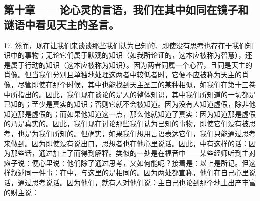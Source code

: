 
\subsection{第十章——论心灵的言语，我们在其中如同在镜子和谜语中看见天主的圣言。}

17. 然而，现在让我们来谈谈那些我们认为已知的、即使没有思考也存在于我们知识中的事物；无论它们属于默观的知识（如我所论证的，这本应被称为智慧），还是属于行动的知识（这本应被称为知识）。因为两者同属一个心智，且同是天主的肖像。但当我们分别且单独地处理这两者中较低者时，它便不应被称为天主的肖像，尽管即使在那个时候，其中也能找到天主圣三的某种相似，如我们在第十三卷中所指出的。因此，我们现在谈论的是人的整体知识，其中我们所知道的一切都是已知的；至少是真实的知识；否则它就不会被知道。因为没有人知道虚假，除非他知道那是虚假的；而如果他知道这一点，那么他就知道了真实：因为知道那是虚假的乃是真实的。因此，我们现在讨论那些我们认为已知的事物，即使它们没有被思考，也是为我们所知的。但确实，如果我们想用言语表达它们，我们只能通过思考来做到。因为即使没有说出口，思想者也在他心里说话。因此，中有这样的话：因为那些话，通过加上了而得到解释。类似的一处是在福音中——某些经师听到主对瘫子说：便心里说：他们除了通过思考，又如何能呢？接着是：以上是所记。但这样叙述同一件事：在中，与这里的是相同的。因为两处都宣称，他们在自己心里说话，通过思考说话。因为他们，就有人对他们说：主自己也论到那个地土出产丰富的财主说：\par

